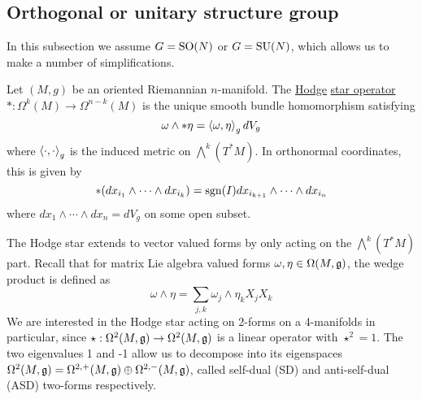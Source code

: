 \subsection{Orthogonal or unitary structure group}
In this subsection we assume $G=\operatorname{SO}(N)$ or  $G=\operatorname{SU}(N)$, which allows us to
make a number of simplifications.
\begin{defn}
	Let $(M,g)$ be an oriented Riemannian  $n$-manifold. The \underline{Hodge}
	\underline{star operator} $* : \Omega^k(M) \to \Omega^{n-k}(M)$ is the 
	unique smooth bundle homomorphism satisfying 
	\begin{equation} \label{eq:hodge_property}
	\omega \wedge *\eta = \gen{\omega,\eta}_g dV_g
	\end{equation}
	where $\gen{\cdot,\cdot}_g$ is the induced metric on $\bigwedge^k(T^*M)$.
	In orthonormal coordinates, this is given by
	\[
	*(dx_{i_1}\wedge \cdots\wedge dx_{i_k}) = \operatorname{sgn}(I)dx_{i_{k+1}}\wedge \cdots \wedge
	dx_{i_n} 
	\] 
	where $dx_1\wedge\cdots\wedge dx_n = dV_g$ on some open subset.
\end{defn}
The Hodge star extends to vector valued forms by only acting on the
$\bigwedge^k(T^*M)$ part. Recall that 
for matrix Lie algebra valued forms $\omega,\eta\in\Omega(M,\operatorname{\mathfrak{g}})$, the wedge 
product is defined as 
\begin{equation}
    \omega\wedge\eta = \sum_{j,k} \omega_j\wedge \eta_k X_j X_k 
\end{equation}
We are interested in the Hodge star acting on 2-forms on a 4-manifolds in
particular, since $\star : \Omega^2(M,\operatorname{\mathfrak{g}})\to\Omega^2(M,\operatorname{\mathfrak{g}})$ is a linear operator
with $\star^2= 1$. The two eigenvalues 1 and -1 allow us to decompose into its
eigenspaces $\Omega^2(M,\operatorname{\mathfrak{g}}) = \Omega^{2,+}(M,\operatorname{\mathfrak{g}}) \oplus \Omega^{2,-}(M,\operatorname{\mathfrak{g}})$,
called self-dual (SD) and anti-self-dual (ASD) two-forms respectively.

